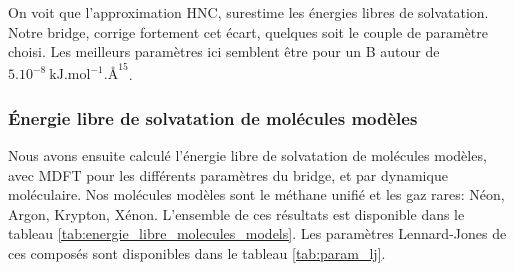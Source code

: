  On voit que l'approximation HNC, surestime les énergies libres de solvatation. Notre bridge, corrige fortement cet écart, quelques soit le couple de paramètre choisi. Les meilleurs paramètres ici semblent être pour un B autour de $5.10^{-8}\  \mathrm{kJ.mol}^{-1}.\text{\AA}^{15}$. 

 



\subsubsection{\'Energie libre de solvatation de molécules modèles}
Nous avons ensuite calculé l'énergie libre de solvatation de molécules modèles, avec MDFT pour les différents paramètres du bridge, et par dynamique moléculaire. Nos molécules modèles sont le méthane unifié et les gaz rares: Néon, Argon, Krypton, Xénon. L'ensemble de ces résultats est disponible dans le tableau \ref{tab:energie_libre_molecules_models}. Les paramètres Lennard-Jones de ces composés sont disponibles dans le tableau \ref{tab:param_lj}.


